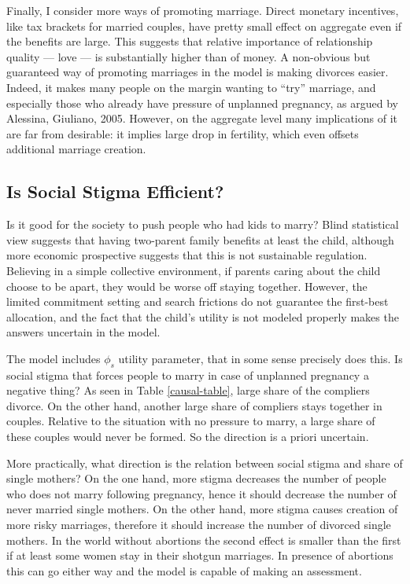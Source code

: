\documentclass[12pt,letter]{article}
\begin{document}
Finally, I consider more ways of promoting marriage. Direct monetary incentives, like tax brackets for married couples, have pretty small effect on aggregate even if the benefits are large. This suggests that relative importance of relationship quality --- love --- is substantially higher than of money. A non-obvious but guaranteed way of promoting marriages in the model is making divorces easier. Indeed, it makes many people on the margin wanting to ``try'' marriage, and especially those who already have pressure of unplanned pregnancy, as argued by Alessina, Giuliano, 2005. However, on the aggregate level many implications of it are far from desirable: it implies large drop in fertility, which even offsets additional marriage creation.


\subsection{Is Social Stigma Efficient?}

Is it good for the society to push people who had kids to marry? Blind statistical view suggests that having two-parent family benefits at least the child, although more economic prospective suggests that this is not sustainable regulation. Believing in a simple collective environment, if parents caring about the child choose to be apart, they would be worse off staying together. However, the limited commitment setting and search frictions do not guarantee the first-best allocation, and the fact that the child's utility is not modeled properly makes the answers uncertain in the model. 

The model includes $\phi_s$ utility parameter, that in some sense precisely does this. Is social stigma that forces people to marry in case of unplanned pregnancy a negative thing? As seen in Table \ref{causal-table}, large share of the compliers divorce. On the other hand, another large share of compliers stays together in couples. Relative to the situation with no pressure to marry, a large share of these couples would never be formed. So the direction is a priori uncertain.

More practically, what direction is the relation between social stigma and share of single mothers? On the one hand, more stigma decreases the number of people who does not marry following pregnancy, hence it should decrease the number of never married single mothers. On the other hand, more stigma causes creation of more risky marriages, therefore it should increase the number of divorced single mothers. In the world without abortions the second effect is smaller than the first if at least some women stay in their shotgun marriages. In presence of abortions this can go either way and the model is capable of making an assessment.
\end{document}
